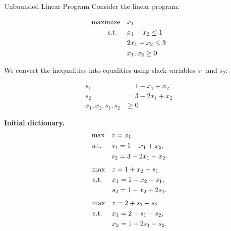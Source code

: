 \begin{example}{Unbounded Linear Program}\label{exa:simplex-unbounded}{}
\label{example:simplex-unbounded}
Consider the linear program:

\[
\begin{aligned}
\mbox{maximize} \quad & x_1 \\
\mbox{ s.t. } \quad
& x_1 - x_2 \leq 1 \\
& 2x_1 - x_2 \leq 3 \\
& x_1, x_2 \geq 0
\end{aligned}
\]

\begin{center}
\par{}\label{fig:unbounded-desmos-simplex}%

\end{center}
We convert the inequalities into equalities using slack variables \( s_1 \) and \( s_2 \):

\[
\begin{aligned}
s_1 &= 1 - x_1 + x_2 \\
s_2 &= 3 - 2x_1 + x_2 \\
x_1, x_2, s_1, s_2 &\geq 0
\end{aligned}
\]

\noindent\textbf{Initial dictionary.}
\[
\begin{aligned}
\max\quad & z = x_1 \\
\mbox{ s.t. }\quad & s_1 = 1 - x_1 + x_2,\\
& s_2 = 3 - 2x_1 + x_2.
\end{aligned}
\]
\[
\begin{aligned}
\max\quad & z = 1 + x_2 - s_1 \\
\mbox{ s.t. }\quad & x_1 = 1 + x_2 - s_1,\\
& s_2 = 1 - x_2 + 2s_1.
\end{aligned}
\]
\[
\begin{aligned}
\max\quad & z = 2 + s_1 - s_2 \\
\mbox{ s.t. }\quad & x_1 = 2 + s_1 - s_2,\\
& x_2 = 1 + 2s_1 - s_2.
\end{aligned}
\]


\end{example}
